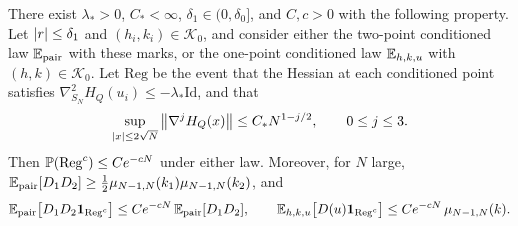 \begin{lemma}\label{lem:mp-regular}
There exist $\lambda_*>0$, $C_*<\infty$, $\delta_1\in(0,\delta_0]$, and $C,c>0$ with the following property. Let $\left|r\right|\le\delta_1$ and $(h_i,k_i)\in\mathcal K_0$, and consider either the two-point conditioned law $\mathbb E_{\mathrm{pair}}$ with these marks, or the one-point conditioned law $\mathbb E_{h,k,u}$ with $(h,k)\in\mathcal K_0$. Let $\mathrm{Reg}$ be the event that the Hessian at each conditioned point satisfies $\nabla^2_{S_N}H_Q(u_i)\le-\lambda_*\mathrm{Id}$, and that
\begin{equation}\label{eq:mp-regularity}
\sup_{\left|x\right|\le2\sqrt N}\left\lVert\nabla^jH_Q(x)\right\rVert\le C_*N^{1-j/2},\qquad 0\le j\le3.
\end{equation}
Then $\mathbb P(\mathrm{Reg}^c)\le Ce^{-cN}$ under either law. Moreover, for $N$ large, $\mathbb E_{\mathrm{pair}}[D_1D_2]\ge\frac12\mu_{N-1,N}(k_1)\mu_{N-1,N}(k_2)$, and
\begin{equation}\label{eq:mp-regular-loss}
\mathbb E_{\mathrm{pair}}\bigl[D_1D_2\mathbf 1_{\mathrm{Reg}^c}\bigr]\le Ce^{-cN}\,\mathbb E_{\mathrm{pair}}[D_1D_2],\qquad \mathbb E_{h,k,u}\bigl[D(u)\mathbf 1_{\mathrm{Reg}^c}\bigr]\le Ce^{-cN}\,\mu_{N-1,N}(k).
\end{equation}
\end{lemma}

